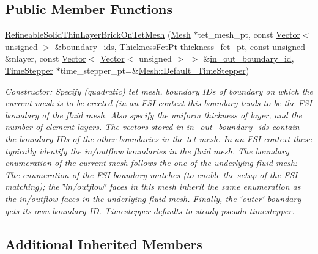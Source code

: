 \subsection*{Public Member Functions}
\begin{DoxyCompactItemize}
\item 
\hyperlink{classoomph_1_1RefineableSolidThinLayerBrickOnTetMesh_adda15e0208b20e1c1f5404c27850fb1b}{Refineable\+Solid\+Thin\+Layer\+Brick\+On\+Tet\+Mesh} (\hyperlink{classoomph_1_1Mesh}{Mesh} $\ast$tet\+\_\+mesh\+\_\+pt, const \hyperlink{classoomph_1_1Vector}{Vector}$<$ unsigned $>$ \&boundary\+\_\+ids, \hyperlink{classoomph_1_1RefineableSolidThinLayerBrickOnTetMesh_a45af8cb1926cec40d597eb18b75b96da}{Thickness\+Fct\+Pt} thickness\+\_\+fct\+\_\+pt, const unsigned \&nlayer, const \hyperlink{classoomph_1_1Vector}{Vector}$<$ \hyperlink{classoomph_1_1Vector}{Vector}$<$ unsigned $>$ $>$ \&\hyperlink{classoomph_1_1ThinLayerBrickOnTetMesh_a3cfd55eb5bbd6801e9d4cd271e602cd8}{in\+\_\+out\+\_\+boundary\+\_\+id}, \hyperlink{classoomph_1_1TimeStepper}{Time\+Stepper} $\ast$time\+\_\+stepper\+\_\+pt=\&\hyperlink{classoomph_1_1Mesh_a12243d0fee2b1fcee729ee5a4777ea10}{Mesh\+::\+Default\+\_\+\+Time\+Stepper})
\begin{DoxyCompactList}\small\item\em Constructor\+: Specify (quadratic) tet mesh, boundary I\+Ds of boundary on which the current mesh is to be erected (in an F\+SI context this boundary tends to be the F\+SI boundary of the fluid mesh. Also specify the uniform thickness of layer, and the number of element layers. The vectors stored in in\+\_\+out\+\_\+boundary\+\_\+ids contain the boundary I\+Ds of the other boundaries in the tet mesh. In an F\+SI context these typically identify the in/outflow boundaries in the fluid mesh. The boundary enumeration of the current mesh follows the one of the underlying fluid mesh\+: The enumeration of the F\+SI boundary matches (to enable the setup of the F\+SI matching); the \char`\"{}in/outflow\char`\"{} faces in this mesh inherit the same enumeration as the in/outflow faces in the underlying fluid mesh. Finally, the \char`\"{}outer\char`\"{} boundary gets its own boundary ID. Timestepper defaults to steady pseudo-\/timestepper. \end{DoxyCompactList}\end{DoxyCompactItemize}
\subsection*{Additional Inherited Members}


